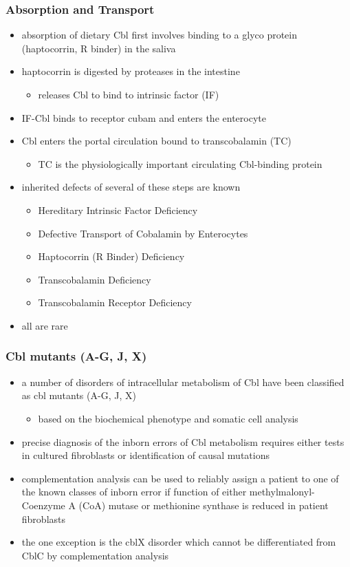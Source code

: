 \documentclass{scrartcl}
\begin{document}
\subsubsection{Absorption and Transport}
\label{sec:org329a960}
\begin{itemize}
\item absorption of dietary Cbl first involves binding to a glyco protein
(haptocorrin, R binder) in the saliva
\item haptocorrin is digested by proteases in the intestine
\begin{itemize}
\item releases Cbl to bind to intrinsic factor (IF)
\end{itemize}
\item IF-Cbl binds to receptor cubam and enters the enterocyte
\item Cbl enters the portal circulation bound to transcobalamin (TC)
\begin{itemize}
\item TC is the physiologically important circulating Cbl-binding
protein
\end{itemize}
\item inherited defects of several of these steps are known
\begin{itemize}
\item Hereditary Intrinsic Factor Deficiency
\item Defective Transport of Cobalamin by Enterocytes
\item Haptocorrin (R Binder) Deficiency
\item Transcobalamin Deficiency
\item Transcobalamin Receptor Deficiency
\end{itemize}
\item all are rare
\end{itemize}
\subsubsection{Cbl mutants (A-G, J, X)}
\label{sec:orgcd40588}
\begin{itemize}
\item a number of disorders of intracellular metabolism of Cbl have been
classified as cbl mutants (A-G, J, X)
\begin{itemize}
\item based on the biochemical phenotype and somatic cell analysis
\end{itemize}
\item precise diagnosis of the inborn errors of Cbl metabolism requires
either tests in cultured fibroblasts or identification of causal
mutations
\item complementation analysis can be used to reliably assign a patient to
one of the known classes of inborn error if function of either
methylmalonyl-Coenzyme A (CoA) mutase or methionine synthase is
reduced in patient fibroblasts
\item the one exception is the cblX disorder which cannot be
differentiated from CblC by complementation analysis
\end{itemize}
\end{document}
